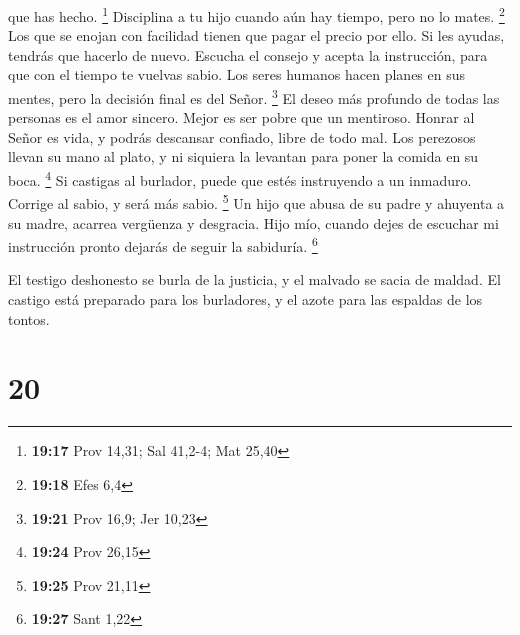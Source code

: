 que has hecho. \footnote{\textbf{19:17} Prov 14,31; Sal 41,2-4; Mat
  25,40}  Disciplina a tu hijo cuando aún hay tiempo, pero
no lo mates. \footnote{\textbf{19:18} Efes 6,4}  Los que se
enojan con facilidad tienen que pagar el precio por ello. Si les ayudas,
tendrás que hacerlo de nuevo.  Escucha el consejo y acepta
la instrucción, para que con el tiempo te vuelvas sabio. 
Los seres humanos hacen planes en sus mentes, pero la decisión final es
del Señor. \footnote{\textbf{19:21} Prov 16,9; Jer 10,23} 
El deseo más profundo de todas las personas es el amor sincero. Mejor es
ser pobre que un mentiroso.  Honrar al Señor es vida, y
podrás descansar confiado, libre de todo mal.  Los
perezosos llevan su mano al plato, y ni siquiera la levantan para poner
la comida en su boca. \footnote{\textbf{19:24} Prov 26,15} 
Si castigas al burlador, puede que estés instruyendo a un inmaduro.
Corrige al sabio, y será más sabio. \footnote{\textbf{19:25} Prov 21,11}
 Un hijo que abusa de su padre y ahuyenta a su madre,
acarrea vergüenza y desgracia.  Hijo mío, cuando dejes de
escuchar mi instrucción pronto dejarás de seguir la sabiduría.
\footnote{\textbf{19:27} Sant 1,22}

 El testigo deshonesto se burla de la justicia, y el
malvado se sacia de maldad.  El castigo está preparado para
los burladores, y el azote para las espaldas de los tontos.

\hypertarget{section-19}{%
\section{20}\label{section-19}}

